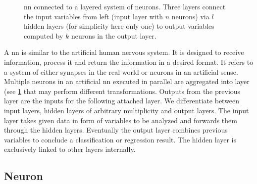 \begin{figure}[hbt]
    
    \caption[Layered neural network]{\acrshort{nn} connected to a layered system of neurons. Three layers connect the input variables from left (input layer with \( n \) neurons) via \( l \) hidden layers (for simplicity here only one) to output variables computed by \( k \) neurons in the output layer. \cite{Neutelings.2021}}
    \label{fig:neuronalnetwork}
\end{figure}
A \acrshort{nn} is similar to the artificial human nervous system. It is designed to receive information, process it and return the information in a desired format. It refers to a system of either synapses in the real world or neurons in an artificial sense. Multiple neurons in an artificial \acrshort{nn} executed in parallel are aggregated into layer (see \cref{fig:neuronalnetwork} that may perform different transformations. Outputs from the previous layer are the inputs for the following attached layer. We differentiate between input layers, hidden layers of arbitrary multiplicity and output layers. The input layer takes given data in form of variables to be analyzed and forwards them through the hidden layers. Eventually the output layer combines previous variables to conclude a classification or \gls{regression} result. The hidden layer is exclusively linked to other layers internally.

\subsection{Neuron}

